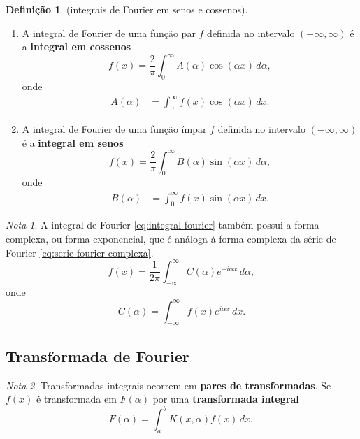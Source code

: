 \documentclass{article}
\theoremstyle{plain}
\theoremstyle{definition}
\newtheorem{defn}{Definição}[section]
\theoremstyle{remark}
\newtheorem*{rem}{Nota}
\begin{document}
\begin{defn} (integrais de Fourier em senos e cossenos).
    \begin{enumerate}
        \item[(i)] A integral de Fourier de uma função par \(f\) definida no intervalo \(\left(-\infty, \infty\right)\) é a \textbf{integral em cossenos}
        \begin{equation}
            f(x) = \frac{2}{\pi} \int_{0}^{\infty} A(\alpha) \cos(\alpha x) \, d\alpha,
        \end{equation}
        \noindent onde
        \begin{align}
            A(\alpha) &= \int_{0}^{\infty} f(x) \cos(\alpha x) \, dx.
        \end{align}
        \item[(ii)] A integral de Fourier de uma função ímpar \(f\) definida no intervalo \(\left(-\infty, \infty\right)\) é a \textbf{integral em senos}
        \begin{equation}
            f(x) = \frac{2}{\pi} \int_{0}^{\infty} B(\alpha) \sin(\alpha x) \, d\alpha,
        \end{equation}
        \noindent onde
        \begin{align}
            B(\alpha) &= \int_{0}^{\infty} f(x) \sin(\alpha x) \, dx.
        \end{align}
    \end{enumerate}
\end{defn}

\begin{rem}
    A integral de Fourier \eqref{eq:integral-fourier} também possui a forma complexa, ou forma exponencial, que é análoga à forma complexa da série de Fourier \eqref{eq:serie-fourier-complexa}.
    \begin{equation}\label{eq:integral-fourier-complexa}
        f(x) = \frac{1}{2\pi} \int_{-\infty}^{\infty} C(\alpha) e^{-i\alpha x} \, d\alpha,
    \end{equation}
    \noindent onde
    \begin{equation}
        C(\alpha) = \int_{-\infty}^{\infty} f(x) e^{i\alpha x} \, dx.
    \end{equation}
\end{rem}

\subsection{Transformada de Fourier}

\begin{rem}
    Transformadas integrais ocorrem em \textbf{pares de transformadas}. Se \(f(x)\) é transformada em \(F(\alpha)\) por uma \textbf{transformada integral}
    \begin{equation}
        F(\alpha) = \int_{a}^{b} K(x,\alpha) f(x) \, dx,
    \end{equation}
\end{rem}
\end{document}
